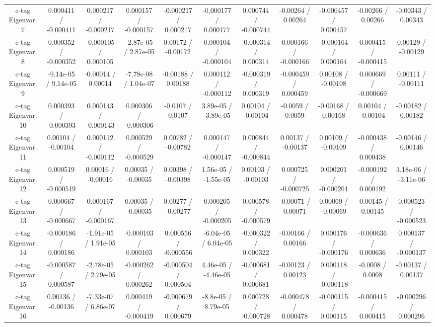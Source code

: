 \begin{table}[htbp]
\begin{center}
\begin{tabular}{|c|c|c|c|c|c|c|c|c|c|c|}
  c-tag Eigenvar. 7 & 0.000411 / -0.000411 & 0.000217 / -0.000217 & 0.000157 / -0.000157 & -0.000217 / 0.000217 & -0.000177 / 0.000177 & 0.000744 / -0.000744 & -0.00264 / 0.00264 & -0.000457 / 0.000457 & -0.00266 / 0.00266 & -0.00343 / 0.00343 \\ 
  c-tag Eigenvar. 8 & 0.000352 / -0.000352 & -0.000105 / 0.000105 & -2.87e-05 / 2.87e-05 & 0.00172 / -0.00172 & 0.000104 / -0.000104 & -0.000314 / 0.000314 & 0.000166 / -0.000166 & -0.000164 / 0.000164 & 0.000415 / -0.000415 & 0.00129 / -0.00129 \\ 
  c-tag Eigenvar. 9 & -9.14e-05 / 9.14e-05 & -0.00014 / 0.00014 & -7.78e-08 / 1.04e-07 & -0.00188 / 0.00188 & 0.000112 / -0.000112 & -0.000319 / 0.000319 & -0.000459 / 0.000459 & 0.00108 / -0.00108 & 0.000669 / -0.000669 & 0.00111 / -0.00111 \\ 
  c-tag Eigenvar. 10 & 0.000393 / -0.000393 & 0.000143 / -0.000143 & 0.000306 / -0.000306 & -0.0107 / 0.0107 & 3.89e-05 / -3.89e-05 & 0.00104 / -0.00104 & -0.0059 / 0.0059 & -0.00168 / 0.00168 & 0.00104 / -0.00104 & -0.00182 / 0.00182 \\ 
  c-tag Eigenvar. 11 & 0.00104 / -0.00104 & 0.000112 / -0.000112 & 0.000529 / -0.000529 & 0.00782 / -0.00782 & 0.000147 / -0.000147 & 0.000844 / -0.000844 & 0.00137 / -0.00137 & 0.00109 / -0.00109 & -0.000438 / 0.000438 & -0.00146 / 0.00146 \\ 
  c-tag Eigenvar. 12 & 0.000519 / -0.000519 & 0.00016 / -0.00016 & 0.00035 / -0.00035 & 0.00398 / -0.00398 & 1.56e-05 / -1.55e-05 & 0.00103 / -0.00103 & 0.000725 / -0.000725 & 0.000201 / -0.000201 & -0.000192 / 0.000192 & 3.18e-06 / -3.11e-06 \\ 
  c-tag Eigenvar. 13 & 0.000667 / -0.000667 & 0.000167 / -0.000167 & 0.00035 / -0.00035 & 0.00277 / -0.00277 & 0.000205 / -0.000205 & 0.000578 / -0.000579 & -0.00071 / 0.00071 & 0.00069 / -0.00069 & -0.00145 / 0.00145 & 0.000523 / -0.000523 \\ 
  c-tag Eigenvar. 14 & -0.000186 / 0.000186 & -1.91e-05 / 1.91e-05 & -0.000103 / 0.000103 & 0.000556 / -0.000556 & -6.04e-05 / 6.04e-05 & -0.000322 / 0.000322 & -0.00166 / 0.00166 & 0.000176 / -0.000176 & -0.000636 / 0.000636 & 0.000137 / -0.000137 \\ 
  c-tag Eigenvar. 15 & -0.000587 / 0.000587 & -2.78e-05 / 2.79e-05 & -0.000262 / 0.000262 & -0.000504 / 0.000504 & 4.46e-05 / -4.46e-05 & -0.000681 / 0.000681 & -0.00123 / 0.00123 & 0.000118 / -0.000118 & -0.0008 / 0.0008 & -0.00137 / 0.00137 \\ 
  c-tag Eigenvar. 16 & 0.00136 / -0.00136 & -7.33e-07 / 6.86e-07 & 0.000419 / -0.000419 & -0.000679 / 0.000679 & -8.8e-05 / 8.79e-05 & 0.000728 / -0.000728 & -0.000478 / 0.000478 & -0.000115 / 0.000115 & -0.000415 / 0.000415 & -0.000296 / 0.000296 \\ 

\end{tabular}
\end{center}
\end{table}
